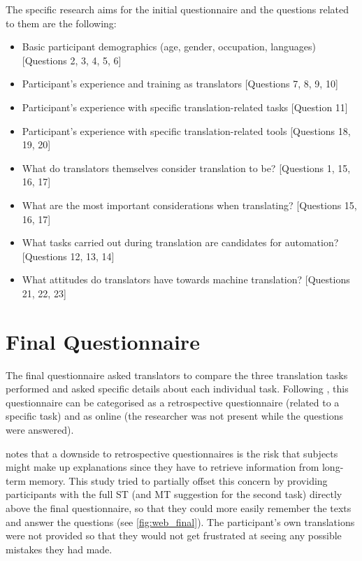 The specific research aims for the initial questionnaire and the questions related to them are the following:

\begin{itemize}
\item Basic participant demographics (age, gender, occupation, languages) [Questions 2, 3, 4, 5, 6]
\item Participant's experience and training as translators [Questions 7, 8, 9, 10]
\item Participant's experience with specific translation-related tasks [Question 11]
\item Participant's experience with specific translation-related tools [Questions 18, 19, 20]
\item What do translators themselves consider translation to be? [Questions 1, 15, 16, 17]
\item What are the most important considerations when translating? [Questions 15, 16, 17]
\item What tasks carried out during translation are candidates for automation? [Questions 12, 13, 14]
\item What attitudes do translators have towards machine translation? [Questions 21, 22, 23]
\end{itemize}


\section{Final Questionnaire}

\noindent The final questionnaire asked translators to compare the three translation tasks performed and asked specific details about each individual task. Following \textcite{krings2005wege}, this questionnaire can be categorised as a retrospective questionnaire (related to a specific task) and as online (the researcher was not present while the questions were answered). 

\textcite{christensen2011studies} notes that a downside to retrospective questionnaires is the risk that subjects might make up explanations since they have to retrieve information from long-term memory. This study tried to partially offset this concern by providing participants with the full \ac{ST} (and \ac{MT} suggestion for the second task) directly above the final questionnaire, so that they could more easily remember the texts and answer the questions (see \autoref{fig:web_final}). The participant's own translations were not provided so that they would not get frustrated at seeing any possible mistakes they had made. 

